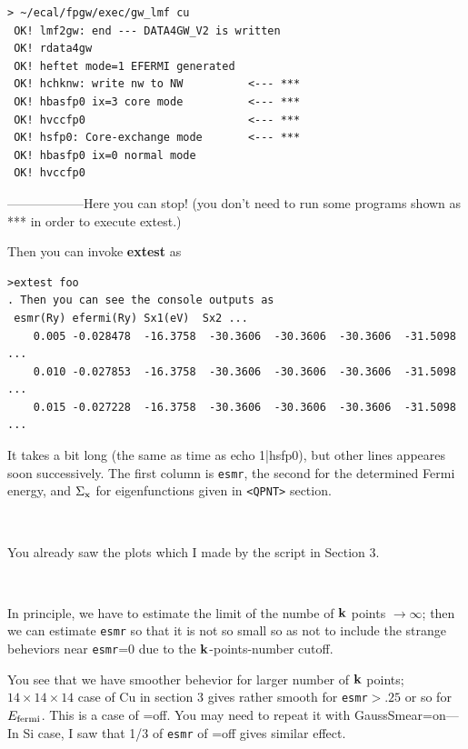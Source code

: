 \documentclass[a4paper,10pt,epsf,fleqn]{article}
\newcommand{\keyw}[1]{\fbox{\tt #1}}
\newcommand{\raw}[1]{{\tt #1}}
\begin{document}
{{{{\baselineskip=3.5mm
\begin{verbatim}
> ~/ecal/fpgw/exec/gw_lmf cu
 OK! lmf2gw: end --- DATA4GW_V2 is written
 OK! rdata4gw
 OK! heftet mode=1 EFERMI generated
 OK! hchknw: write nw to NW          <--- ***
 OK! hbasfp0 ix=3 core mode          <--- ***
 OK! hvccfp0                         <--- ***
 OK! hsfp0: Core-exchange mode       <--- ***
 OK! hbasfp0 ix=0 normal mode
 OK! hvccfp0
\end{verbatim}}
------------------Here you can stop!
(you don't need to run some programs shown as ***  in order to execute extest.)

Then you can invoke {\bf extest} as
{\baselineskip=3.5mm
\begin{verbatim}
>extest foo
. Then you can see the console outputs as
 esmr(Ry) efermi(Ry) Sx1(eV)  Sx2 ...
    0.005 -0.028478  -16.3758  -30.3606  -30.3606  -30.3606  -31.5098  ...
    0.010 -0.027853  -16.3758  -30.3606  -30.3606  -30.3606  -31.5098  ...
    0.015 -0.027228  -16.3758  -30.3606  -30.3606  -30.3606  -31.5098  ...
\end{verbatim}}
It takes a bit long (the same as time as echo 1|hsfp0),
but other lines appeares soon successively.
The first column is {\tt esmr}, the second for the determined Fermi energy,
and $\Sigma_{\rm x}$ for eigenfunctions given in \verb#<QPNT># section.

\ 

You already saw the plots which I made by the script in Section 3.

\ 

In principle, we have to estimate the limit of the numbe of ${\bf k}$ points $\to \infty$;
then we can estimate {\tt esmr} so that it is not so small so as not to include
the strange beheviors near {\tt esmr}=0 due to the ${\bf k}$-points-number cutoff.

You see that we have smoother behevior for larger number of ${\bf k}$ points;
$14\times14\times14$ case of Cu in section 3 gives rather smooth for {\tt esmr}$>.25$ or so for $E_{\rm fermi}$.
This is a case of \keyw{GaussSmear}=off. You may need to repeat it with  {GaussSmear}=on---
In Si case, I saw that 1/3 of \raw{esmr} of \keyw{GaussSmear}=off gives similar effect.

}}}
\end{document}
